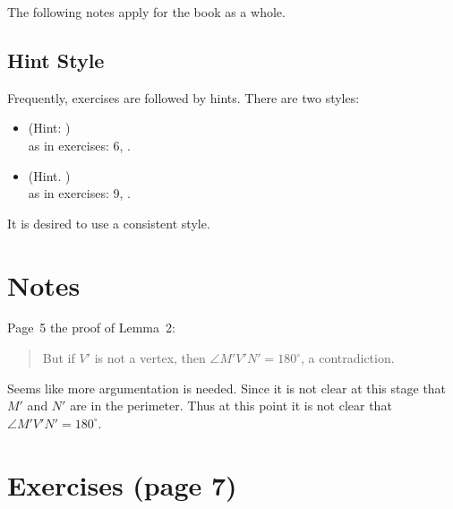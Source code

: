 The following notes apply for the book as a whole.

\subsection{Hint Style}

Frequently, exercises are followed by hints.
There are two styles:
\begin{itemize} %
 \item  \mldots (Hint: \mldots)\\
        as in exercises: 6, .
 \item  \mldots (Hint. \mldots)\\
        as in exercises: 9, .
\end{itemize}
It is desired to use a consistent style.


\section{Notes}

Page~5 the proof of Lemma~2:
\begin{quote}
But if \(V'\) is not a vertex, then \(\angle M'V'N'=180^{\circ}\),
a contradiction.
\end{quote}
Seems like more argumentation is needed. Since it is not clear
at this stage that \(M'\) and \(N'\) are in the perimeter.
Thus at this point it is not clear that \(\angle M'V'N'=180^{\circ}\).




\section{Exercises (page 7)}

